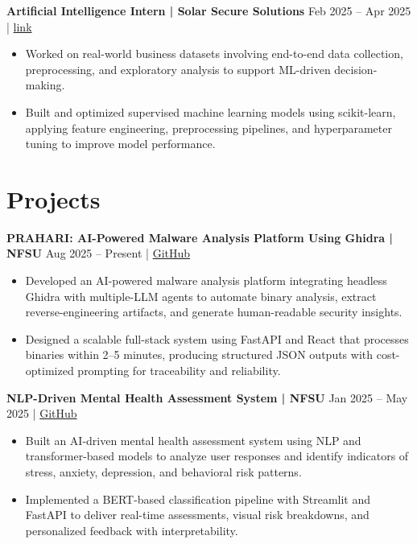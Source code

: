 \documentclass[a4paper,10pt]{article}
\begin{document}
\textbf{Artificial Intelligence Intern | Solar Secure Solutions} \hfill Feb 2025 -- Apr 2025 |
\href{https://drive.google.com/file/d/1v5wkboBHZhA96TD6UUG0w7nRD0ga55KI/view?usp=sharing}{link}
\begin{itemize}[leftmargin=*]
\item Worked on real-world business datasets involving end-to-end data collection, preprocessing, and exploratory analysis to support ML-driven decision-making.
\item Built and optimized supervised machine learning models using scikit-learn, applying feature engineering, preprocessing pipelines, and hyperparameter tuning to improve model performance.
\end{itemize}


\section{\textbf{Projects}}

\textbf{PRAHARI: AI-Powered Malware Analysis Platform Using Ghidra | NFSU} \hfill Aug 2025 -- Present |
\href{https://github.com/MIHIR-RANJAN/PRAHARI-AI-POWERED-MALWARE-ANALYSIS-PLATFORM-USING-GHIDRA.git}{GitHub}
\begin{itemize}[leftmargin=*]
\item Developed an AI-powered malware analysis platform integrating headless Ghidra with multiple-LLM agents to automate binary analysis, extract reverse-engineering artifacts, and generate human-readable security insights.
\item Designed a scalable full-stack system using FastAPI and React that processes binaries within 2--5 minutes, producing structured JSON outputs with cost-optimized prompting for traceability and reliability.
\end{itemize}

\textbf{NLP-Driven Mental Health Assessment System | NFSU} \hfill Jan 2025 -- May 2025 |
\href{https://github.com/MIHIR-RANJAN/mental-health-assessment.git}{GitHub}
\begin{itemize}[leftmargin=*]
\item Built an AI-driven mental health assessment system using NLP and transformer-based models to analyze user responses and identify indicators of stress, anxiety, depression, and behavioral risk patterns.
\item Implemented a BERT-based classification pipeline with Streamlit and FastAPI to deliver real-time assessments, visual risk breakdowns, and personalized feedback with interpretability.
\end{itemize}
\end{document}

